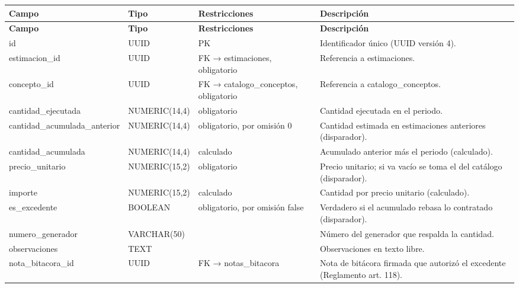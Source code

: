 \begin{xltabular}{\linewidth}{@{}>{\ttfamily\footnotesize}p{4.9cm}>{\ttfamily\footnotesize}p{2.4cm}>{\raggedright\arraybackslash\footnotesize}p{3.3cm}>{\footnotesize}X@{}}
\toprule\normalfont\sffamily\bfseries\footnotesize Campo & \normalfont\sffamily\bfseries\footnotesize Tipo & \sffamily\bfseries Restricciones & \sffamily\bfseries Descripción\\\midrule\endfirsthead
\toprule\normalfont\sffamily\bfseries\footnotesize Campo & \normalfont\sffamily\bfseries\footnotesize Tipo & \sffamily\bfseries Restricciones & \sffamily\bfseries Descripción\\\midrule\endhead
\bottomrule\endfoot
id & UUID & PK & Identificador único (UUID versión 4).\\
estimacion\_id & UUID & FK → estimaciones, obligatorio & Referencia a estimaciones.\\
concepto\_id & UUID & FK → catalogo\_conceptos, obligatorio & Referencia a catalogo\_conceptos.\\
cantidad\_ejecutada & NUMERIC(14,4) & obligatorio & Cantidad ejecutada en el periodo.\\
cantidad\_acumulada\_anterior & NUMERIC(14,4) & obligatorio, por omisión 0 & Cantidad estimada en estimaciones anteriores (disparador).\\
cantidad\_acumulada & NUMERIC(14,4) & calculado & Acumulado anterior más el periodo (calculado).\\
precio\_unitario & NUMERIC(15,2) & obligatorio & Precio unitario; si va vacío se toma el del catálogo (disparador).\\
importe & NUMERIC(15,2) & calculado & Cantidad por precio unitario (calculado).\\
es\_excedente & BOOLEAN & obligatorio, por omisión false & Verdadero si el acumulado rebasa lo contratado (disparador).\\
numero\_generador & VARCHAR(50) &  & Número del generador que respalda la cantidad.\\
observaciones & TEXT &  & Observaciones en texto libre.\\
nota\_bitacora\_id & UUID & FK → notas\_bitacora & Nota de bitácora firmada que autorizó el excedente (Reglamento art. 118).\\
\end{xltabular}

